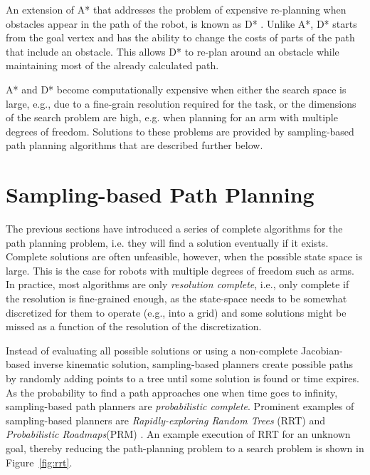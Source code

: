 An extension of A* that addresses the problem of expensive re-planning when obstacles appear in the path of the robot, is known as D* \cite{stentz1994optimal}. Unlike A*, D* starts from the goal vertex and has the ability to change the costs of parts of the path that include an obstacle. This allows D* to re-plan around an obstacle while maintaining most of the already calculated path.

A* and D* become computationally expensive when either the search space is large, e.g., due to a fine-grain resolution required for the task, or the dimensions of the search problem are high, e.g. when planning for an arm with multiple degrees of freedom. Solutions to these problems are provided by sampling-based path planning algorithms that are described further below.




\section{Sampling-based Path Planning}
The previous sections have introduced a series of complete algorithms for the path planning problem, i.e. they will find a solution eventually if it exists. Complete solutions are often unfeasible, however, when the possible state space is large. This is the case for robots with multiple degrees of freedom such as arms. In practice, most algorithms are only \emph{resolution complete}, i.e., only complete if the resolution is fine-grained enough, as the state-space needs to be somewhat discretized for them to operate (e.g., into a grid) and some solutions might be missed as a function of the resolution of the discretization.

Instead of evaluating all possible solutions or using a non-complete Jacobian-based inverse kinematic solution, sampling-based planners create possible paths by randomly adding points to a tree until some solution is found or time expires. As the probability to find a path approaches one when time goes to infinity, sampling-based path planners are \emph{probabilistic complete}. Prominent examples of sampling-based planners are \emph{Rapidly-exploring Random Trees} (RRT)\cite{lavalle1998rapidly} and \emph{Probabilistic Roadmaps}(PRM) \cite{kavraki1996probabilistic}. An example execution of RRT for an unknown goal, thereby reducing the path-planning problem to a search problem is shown in Figure~\ref{fig:rrt}.

